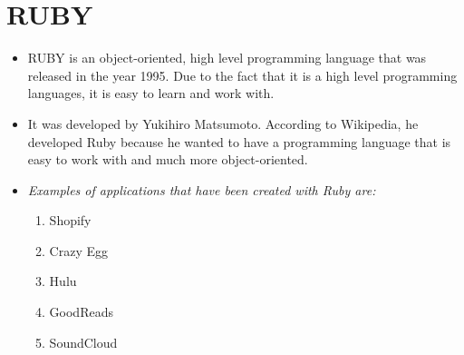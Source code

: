 \documentclass{article}
\begin{document}
	
	\section{RUBY}
	\begin{itemize}
		\item RUBY is an object-oriented, high level programming language that was released in the year 1995. Due to the fact that it is a high level programming languages, it is easy to learn and work with.
		\item It was developed by Yukihiro Matsumoto. According to Wikipedia, he developed Ruby because he wanted to have a programming language that is easy to work with and much more object-oriented.
		\item \textit{Examples of applications that have been created with Ruby are:}
		\begin{enumerate}
			\item Shopify
			\item Crazy Egg
			\item Hulu
			\item GoodReads
			\item SoundCloud
		\end{enumerate}     
	\end{itemize}
	
\end{document}
